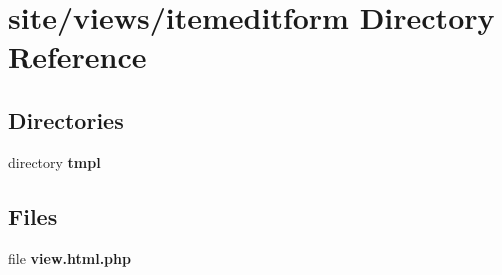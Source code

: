 \section{site/views/itemeditform Directory Reference}
\label{dir_2d36c0b6c1ca94743e80571e45a6b142}
\subsection*{Directories}
\begin{DoxyCompactItemize}
\item 
directory \textbf{ tmpl}
\end{DoxyCompactItemize}
\subsection*{Files}
\begin{DoxyCompactItemize}
\item 
file \textbf{ view.\+html.\+php}
\end{DoxyCompactItemize}
